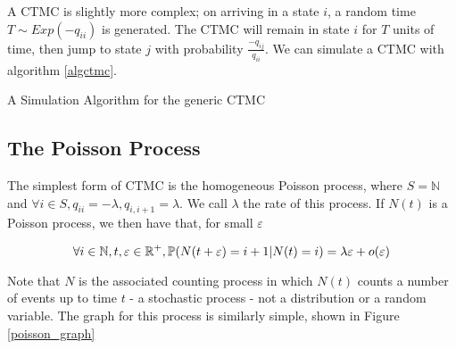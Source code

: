 A CTMC is slightly more complex; on arriving in a state $i$, a random time $T \sim Exp(-q_{ii})$ is generated. The CTMC will remain in state $i$ for $T$ units of time, then jump to state $j$ with probability $\frac{-q_{ij}}{q_{ii}}$. We can simulate a CTMC with algorithm \ref{algctmc}.

\begin{algorithm}
\SetAlgoLined
{}

\caption{A Simulation Algorithm for the generic CTMC}\label{algctmc}

\end{algorithm}

\subsection{The Poisson Process}

The simplest form of CTMC is the homogeneous Poisson process, where $S = \mathbb{N}$ and $\forall i \in S, q_{ii}=-\lambda, q_{i,i+1} = \lambda$. We call $\lambda$ the rate of this process. If $N(t)$ is a Poisson process, we then have that, for small $\varepsilon$

$$
\forall i \in \mathbb{N}, t,\varepsilon \in \mathbb{R}^{+}, \mathbb{P} (N(t+\varepsilon) = i+1 | N(t) = i) = \lambda \varepsilon + o(\varepsilon)
$$

Note that $N$ is the associated counting process in which $N(t)$ counts a number of events up to time $t$ - a stochastic process - not a distribution or a random variable. The graph for this process is similarly simple, shown in Figure \ref{poisson_graph}

